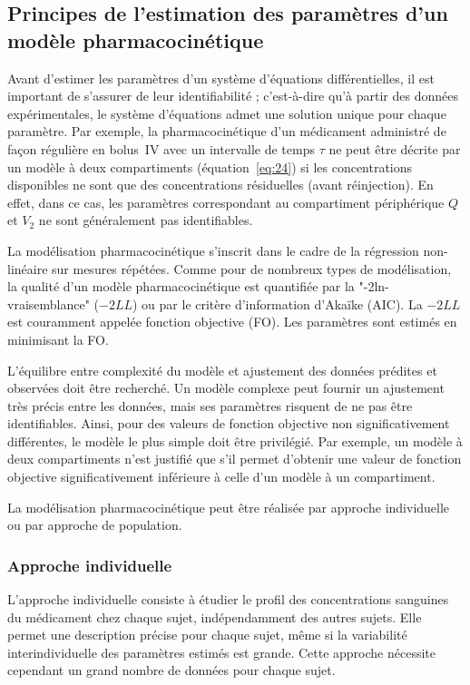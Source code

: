 \subsection{Principes de l'estimation des paramètres d'un modèle pharmacocinétique}
Avant d'estimer les paramètres d'un système d'équations différentielles, il est important de s'assurer de leur identifiabilité ; c'est-à-dire qu'à partir des données expérimentales, le système d'équations admet une solution unique pour chaque paramètre. Par exemple, la pharmacocinétique d'un médicament administré de façon régulière en bolus~IV avec un intervalle de temps $\tau$ ne peut être décrite par un modèle à deux compartiments (équation~\ref{eq:24}) si les concentrations disponibles ne sont que des concentrations résiduelles (avant réinjection). En effet, dans ce cas, les paramètres correspondant au compartiment périphérique $Q$ et $V_2$ ne sont généralement pas identifiables.

La modélisation pharmacocinétique s'inscrit dans le cadre de la régression non-linéaire sur mesures répétées. Comme pour de nombreux types de modélisation, la qualité d'un modèle pharmacocinétique est quantifiée par la "-2ln-vraisemblance" ($-2LL$) ou par le critère d'information d'Akaïke (AIC). La $-2LL$ est couramment appelée fonction objective (FO). Les paramètres sont estimés en minimisant la FO. 

L'équilibre entre complexité du modèle et ajustement des données prédites et observées doit être recherché. Un modèle complexe peut fournir un ajustement très précis entre les données, mais ses paramètres risquent de ne pas être identifiables. Ainsi, pour des valeurs de fonction objective non significativement différentes, le modèle le plus simple doit être privilégié. Par exemple, un modèle à deux compartiments n'est justifié que s'il permet d'obtenir une valeur de fonction objective significativement inférieure à celle d'un modèle à un compartiment.

La modélisation pharmacocinétique peut être réalisée par approche individuelle ou par approche de population. 

\subsubsection{Approche individuelle}
L'approche individuelle consiste à étudier le profil des concentrations sanguines du médicament chez chaque sujet, indépendamment des autres sujets. Elle permet une description précise pour chaque sujet, même si la variabilité interindividuelle des paramètres estimés est grande. Cette approche nécessite cependant un grand nombre de données pour chaque sujet.

